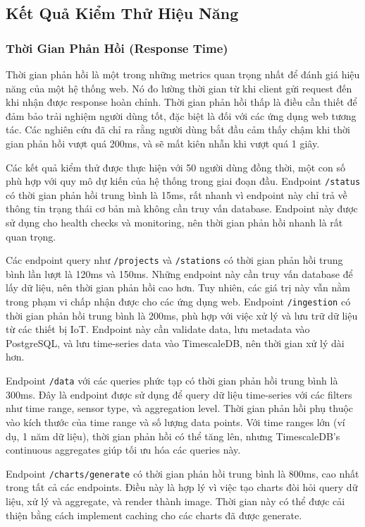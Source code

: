 \subsection{Kết Quả Kiểm Thử Hiệu Năng}

\subsubsection{Thời Gian Phản Hồi (Response Time)}

Thời gian phản hồi là một trong những metrics quan trọng nhất để đánh giá hiệu năng của một hệ thống web. Nó đo lường thời gian từ khi client gửi request đến khi nhận được response hoàn chỉnh. Thời gian phản hồi thấp là điều cần thiết để đảm bảo trải nghiệm người dùng tốt, đặc biệt là đối với các ứng dụng web tương tác. Các nghiên cứu đã chỉ ra rằng người dùng bắt đầu cảm thấy chậm khi thời gian phản hồi vượt quá 200ms, và sẽ mất kiên nhẫn khi vượt quá 1 giây.

Các kết quả kiểm thử được thực hiện với 50 người dùng đồng thời, một con số phù hợp với quy mô dự kiến của hệ thống trong giai đoạn đầu. Endpoint \texttt{/status} có thời gian phản hồi trung bình là 15ms, rất nhanh vì endpoint này chỉ trả về thông tin trạng thái cơ bản mà không cần truy vấn database. Endpoint này được sử dụng cho health checks và monitoring, nên thời gian phản hồi nhanh là rất quan trọng.

Các endpoint query như \texttt{/projects} và \texttt{/stations} có thời gian phản hồi trung bình lần lượt là 120ms và 150ms. Những endpoint này cần truy vấn database để lấy dữ liệu, nên thời gian phản hồi cao hơn. Tuy nhiên, các giá trị này vẫn nằm trong phạm vi chấp nhận được cho các ứng dụng web. Endpoint \texttt{/ingestion} có thời gian phản hồi trung bình là 200ms, phù hợp với việc xử lý và lưu trữ dữ liệu từ các thiết bị IoT. Endpoint này cần validate data, lưu metadata vào PostgreSQL, và lưu time-series data vào TimescaleDB, nên thời gian xử lý dài hơn.

Endpoint \texttt{/data} với các queries phức tạp có thời gian phản hồi trung bình là 300ms. Đây là endpoint được sử dụng để query dữ liệu time-series với các filters như time range, sensor type, và aggregation level. Thời gian phản hồi phụ thuộc vào kích thước của time range và số lượng data points. Với time ranges lớn (ví dụ, 1 năm dữ liệu), thời gian phản hồi có thể tăng lên, nhưng TimescaleDB's continuous aggregates giúp tối ưu hóa các queries này.

Endpoint \texttt{/charts/generate} có thời gian phản hồi trung bình là 800ms, cao nhất trong tất cả các endpoints. Điều này là hợp lý vì việc tạo charts đòi hỏi query dữ liệu, xử lý và aggregate, và render thành image. Thời gian này có thể được cải thiện bằng cách implement caching cho các charts đã được generate.

